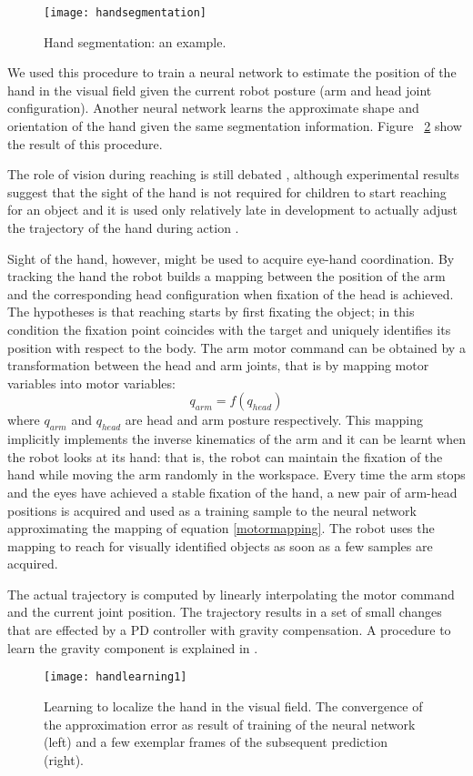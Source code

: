 \begin{figure}
\centering
\texttt{[image: handsegmentation]}
\caption{Hand segmentation: an example.}
\label{fig-handsegmentation}
\end{figure}

We used this procedure to train a neural network to estimate the position of the hand in the visual field given the current robot posture (arm and head joint configuration). Another neural network learns the approximate shape and orientation of the hand given the same segmentation information. Figure ~\ref{sec-handlearning1} show the result of this procedure. 

The role of vision during reaching is still debated \cite{saunders03humans}, although experimental results suggest that the sight of the hand is not required for children to start reaching for an object \cite{clifton93isvisually,clifton94multimodal} and it is used only relatively late in development to actually adjust the trajectory of the hand during action \cite{ashmead93visual}. 

Sight of the hand, however, might be used to acquire eye-hand coordination. By tracking the hand the robot builds a mapping between the position of the arm and the corresponding head configuration when fixation of the head is achieved. The hypotheses is that reaching starts by first fixating the object; in this condition the fixation point coincides with the target and uniquely identifies its position with respect to the body. The arm motor command can be obtained by a transformation between the head and arm joints, that is by mapping motor variables into motor variables:
\begin{equation}q_{arm}=f(q_{head})\label{motormapping}\end{equation}
\noindent where $q_{arm}$ and $q_{head}$ are head and arm posture respectively. This mapping implicitly implements the inverse kinematics of the arm and it can be learnt when the robot looks at its hand: that is, the robot can maintain the fixation of the hand while moving the arm randomly in the workspace. Every time the arm stops and the eyes have achieved a stable fixation of the hand, a new pair of arm-head positions is acquired and used as a training sample to the neural network approximating the mapping of equation \ref{motormapping}. The robot uses the mapping to reach for visually identified objects as soon as a few samples are acquired.

The actual trajectory is computed by linearly interpolating the motor command and the current joint position. The trajectory results in a set of small changes that are effected by a PD controller with gravity compensation. A procedure to learn the gravity component is explained in \cite{natale04thesis}.

\begin{figure}
\centering
\texttt{[image: handlearning1]}
\caption{Learning to localize the hand in the visual field. The convergence of the approximation error as result of training of the neural network (left) and a few exemplar frames of the subsequent prediction (right).}
\label{sec-handlearning1}
\end{figure}

